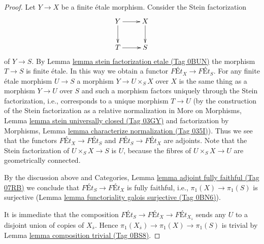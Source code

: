 \documentclass{amsart}
\theoremstyle{plain}
\theoremstyle{definition}
\theoremstyle{remark}
\numberwithin{equation}{subsection}
\begin{document}
\begin{proof}
Let $Y \to X$ be a finite \'etale morphism. Consider the Stein factorization
$$
\xymatrix{
Y \ar[d] \ar[r] & X \ar[d] \\
T \ar[r] & S
}
$$
of $Y \to S$. By Lemma \href{https://stacks.math.columbia.edu/tag/0BUN}{lemma stein factorization etale (Tag 0BUN)}
the morphism $T \to S$ is finite \'etale. In this way we obtain
a functor $\textit{F\'Et}_X \to \textit{F\'Et}_S$.
For any finite \'etale morphism $U \to S$ a morphism
$Y \to U \times_S X$ over $X$ is the same thing as a morphism
$Y \to U$ over $S$ and such a morphism factors uniquely through
the Stein factorization, i.e., corresponds to a unique
morphism $T \to U$
(by the construction of the Stein factorization as a relative
normalization in More on Morphisms, Lemma
\href{https://stacks.math.columbia.edu/tag/03GY}{lemma stein universally closed (Tag 03GY)}
and factorization by
Morphisms, Lemma \href{https://stacks.math.columbia.edu/tag/035I}{lemma characterize normalization (Tag 035I)}).
Thus we see that the functors
$\textit{F\'Et}_X \to \textit{F\'Et}_S$ and
$\textit{F\'Et}_S \to \textit{F\'Et}_X$ are adjoints.
Note that the Stein factorization of $U \times_S X \to S$ is
$U$, because the fibres of $U \times_S X \to U$ are geometrically connected.

\medskip\noindent
By the discussion above and
Categories, Lemma \href{https://stacks.math.columbia.edu/tag/07RB}{lemma adjoint fully faithful (Tag 07RB)}
we conclude that
$\textit{F\'Et}_S \to \textit{F\'Et}_X$
is fully faithful, i.e., $\pi_1(X) \to \pi_1(S)$ is surjective
(Lemma \href{https://stacks.math.columbia.edu/tag/0BN6}{lemma functoriality galois surjective (Tag 0BN6)}).

\medskip\noindent
It is immediate that the composition
$\textit{F\'Et}_S \to \textit{F\'Et}_X \to \textit{F\'Et}_{X_{\overline{s}}}$
sends any $U$ to a disjoint union of copies of $X_{\overline{s}}$.
Hence $\pi_1(X_{\overline{s}}) \to \pi_1(X) \to \pi_1(S)$ is trivial
by Lemma \href{https://stacks.math.columbia.edu/tag/0BS8}{lemma composition trivial (Tag 0BS8)}.


\end{proof}
\end{document}
